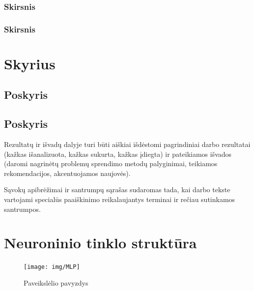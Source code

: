 \documentclass{VUMIFPSkursinis}
\begin{document}
\subsubsection{Skirsnis}
\subsubsection{Skirsnis}
\section{Skyrius}
\subsection{Poskyris}
\subsection{Poskyris}

Rezultatų ir išvadų dalyje turi būti aiškiai išdėstomi pagrindiniai darbo
rezultatai (kažkas išanalizuota, kažkas sukurta, kažkas įdiegta) ir pateikiamos
išvados (daromi nagrinėtų problemų sprendimo metodų palyginimai, teikiamos
rekomendacijos, akcentuojamos naujovės).

\printbibliography[heading=bibintoc]  %

Sąvokų apibrėžimai ir santrumpų sąrašas sudaromas tada, kai darbo tekste
vartojami specialūs paaiškinimo reikalaujantys terminai ir rečiau sutinkamos
santrumpos.

\appendix  %

\section{Neuroninio tinklo struktūra}
\begin{figure}[H]
    \centering
    \texttt{[image: img/MLP]}
    \caption{Paveikslėlio pavyzdys}
    \label{img:mlp}
\end{figure}
\end{document}

